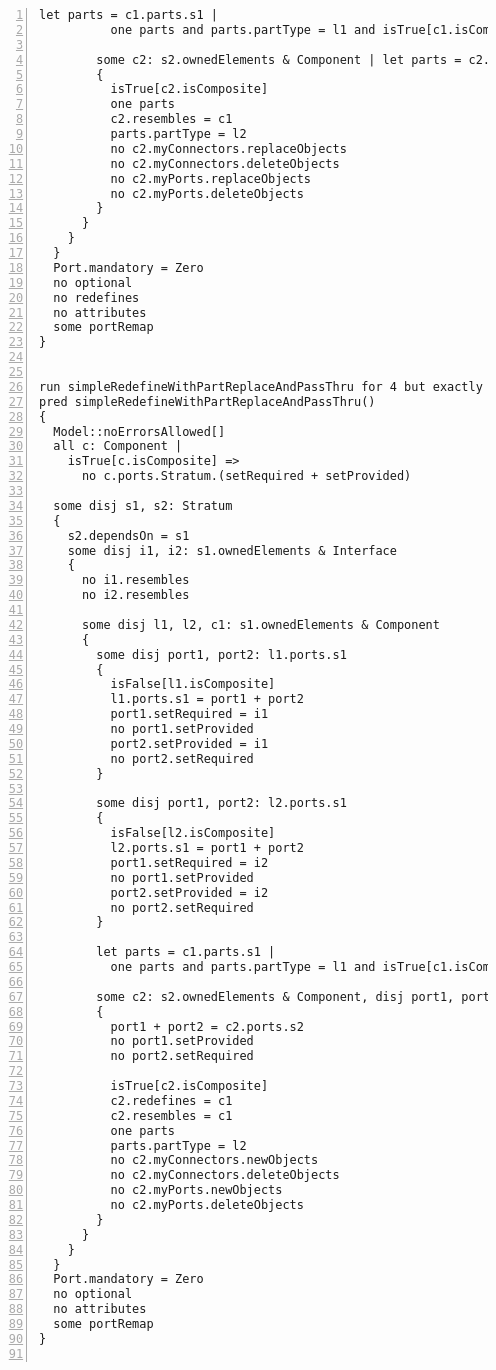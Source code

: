 \begin{lstlisting}[caption={unittests\_redefinition.als}, numbers=left]
        let parts = c1.parts.s1 |
          one parts and parts.partType = l1 and isTrue[c1.isComposite]

        some c2: s2.ownedElements & Component | let parts = c2.parts.s2
        {
          isTrue[c2.isComposite]
          one parts
          c2.resembles = c1
          parts.partType = l2
          no c2.myConnectors.replaceObjects
          no c2.myConnectors.deleteObjects
          no c2.myPorts.replaceObjects
          no c2.myPorts.deleteObjects
        }
      }      
    }
  }
  Port.mandatory = Zero
  no optional
  no redefines
  no attributes
  some portRemap
}


run simpleRedefineWithPartReplaceAndPassThru for 4 but exactly 2 Stratum, 4 Component, exactly 2 Interface, 6 Port, 6 PortID, 4 ConnectorEnd, 8 LinkEnd
pred simpleRedefineWithPartReplaceAndPassThru()
{
  Model::noErrorsAllowed[]
  all c: Component |
    isTrue[c.isComposite] =>
      no c.ports.Stratum.(setRequired + setProvided)
  
  some disj s1, s2: Stratum
  {
    s2.dependsOn = s1
    some disj i1, i2: s1.ownedElements & Interface
    {
      no i1.resembles
      no i2.resembles
      
      some disj l1, l2, c1: s1.ownedElements & Component
      {
        some disj port1, port2: l1.ports.s1
        {
          isFalse[l1.isComposite]
          l1.ports.s1 = port1 + port2
          port1.setRequired = i1
          no port1.setProvided
          port2.setProvided = i1
          no port2.setRequired
        }

        some disj port1, port2: l2.ports.s1
        {
          isFalse[l2.isComposite]
          l2.ports.s1 = port1 + port2
          port1.setRequired = i2
          no port1.setProvided
          port2.setProvided = i2
          no port2.setRequired
        }
        
        let parts = c1.parts.s1 |
          one parts and parts.partType = l1 and isTrue[c1.isComposite]

        some c2: s2.ownedElements & Component, disj port1, port2: Port | let parts = c2.parts.s2
        {
          port1 + port2 = c2.ports.s2
          no port1.setProvided
          no port2.setRequired

          isTrue[c2.isComposite]
          c2.redefines = c1
          c2.resembles = c1
          one parts
          parts.partType = l2
          no c2.myConnectors.newObjects
          no c2.myConnectors.deleteObjects
          no c2.myPorts.newObjects
          no c2.myPorts.deleteObjects
        }
      }      
    }
  }
  Port.mandatory = Zero
  no optional
  no attributes
  some portRemap
}


\end{lstlisting}
